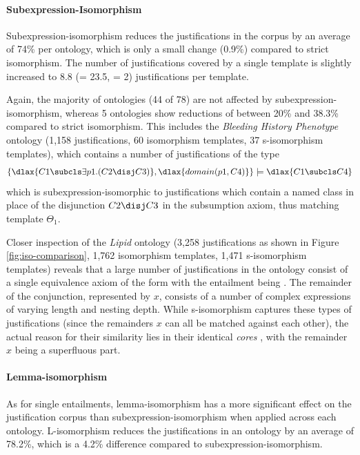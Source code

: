 \paragraph{Subexpression-Isomorphism}

Subexpression-isomorphism reduces the justifications in the corpus by an average of 74\% per ontology, which is only a small change (0.9\%) compared to strict isomorphism. The number of justifications covered by a single template is slightly increased to 8.8 (\sdev = 23.5, \median = 2) justifications per template.

Again, the majority of ontologies (44 of 78) are not affected by subexpression-isomorphism, whereas 5 ontologies show reductions of between 20\% and 38.3\% compared to strict isomorphism. This includes the \emph{Bleeding History Phenotype} ontology (1,158 justifications, 60 isomorphism templates, 37 s-isomorphism templates), which contains a number of justifications of the type
\begin{align*}
\{ \dlax{C1 \subcls \exists p1.(C2 \disj C3)}, \dlax{domain(p1, C4)} \} \models \dlax{C1 \subcls C4}
\end{align*}
which is subexpression-isomorphic to justifications which contain a named class in place of the disjunction $C2 \disj C3$ in the subsumption axiom, thus matching template $\Theta_{1}$.

Closer inspection of the \emph{Lipid} ontology (3,258 justifications as shown in Figure \ref{fig:iso-comparison}, 1,762 isomorphism templates, 1,471 s-isomorphism templates) reveals that a large number of justifications in the ontology consist of a single equivalence axiom of the form  with the entailment being . The remainder of the conjunction, represented by $x$, consists of a number of complex expressions of varying length and nesting depth. While s-isomorphism captures these types of justifications (since the remainders $x$ can all be matched against each other), the actual reason for their similarity lies in their identical \emph{cores} , with the remainder $x$ being a superfluous part.

\paragraph{Lemma-isomorphism}

As for single entailments, lemma-isomorphism has a more significant effect on the justification corpus than subexpression-isomorphism when applied across each ontology. L-isomorphism reduces the justifications in an ontology by an average of 78.2\%, which is a 4.2\% difference compared to subexpression-isomorphism. 

